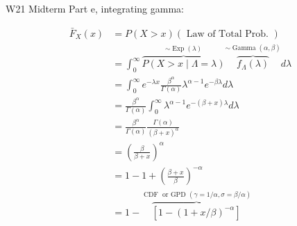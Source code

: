 \documentclass[
  oneside]{book}
\begin{document}
W21 Midterm Part e, integrating gamma:

\[
\begin{aligned}
\bar{F}_X(x) & =P(X>x)(\text { Law of Total Prob. }) \\
& =\int_0^{\infty} \overbrace{P(X>x \mid \Lambda=\lambda)}^{\sim \operatorname{Exp}(\lambda)} \overbrace{f_{\Lambda}(\lambda)}^{\sim \operatorname{Gamma}(\alpha, \beta)} d \lambda \\
& =\int_0^{\infty} e^{-\lambda x} \frac{\beta^\alpha}{\Gamma(\alpha)} \lambda^{\alpha-1} e^{-\beta \lambda} d \lambda \\
& =\frac{\beta^\alpha}{\Gamma(\alpha)} \int_0^{\infty} \lambda^{\alpha-1} e^{-(\beta+x) \lambda} d \lambda \\
& =\frac{\beta^\alpha}{\Gamma(\alpha)} \frac{\Gamma(\alpha)}{(\beta+x)^\alpha} \\
& =\left(\frac{\beta}{\beta+x}\right)^\alpha \\
& =1-1+\left(\frac{\beta+x}{\beta}\right)^{-\alpha} \\
& =1-\overbrace{\left[1-(1+x / \beta)^{-\alpha}\right]}^{\operatorname{CDF} \text { or GPD }(\gamma=1 / \alpha, \sigma=\beta / \alpha)}
\end{aligned}
\]

  
\end{document}
